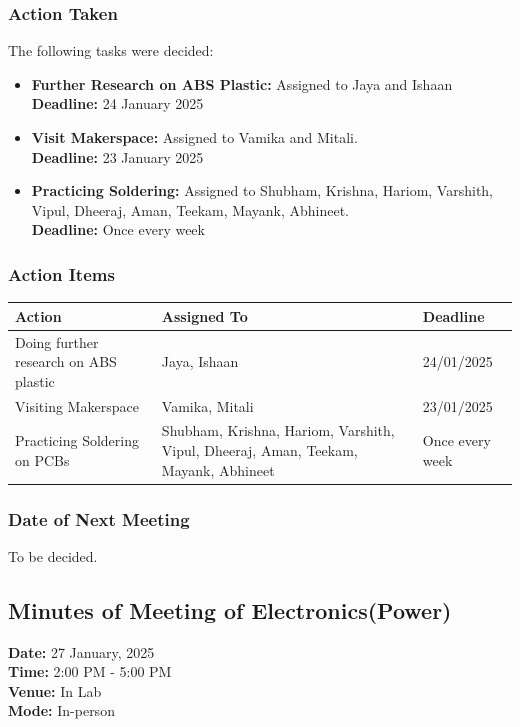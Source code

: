 \documentclass[12pt,a4paper]{article}
\begin{document}
\subsubsection*{Action Taken}
The following tasks were decided:
\begin{itemize}
    \item \textbf{Further Research on ABS Plastic:} Assigned to Jaya and Ishaan \\
    \textbf{Deadline:} 24 January 2025
    \item \textbf{Visit Makerspace:} Assigned to Vamika and Mitali. \\
    \textbf{Deadline:} 23 January 2025
    \item \textbf{Practicing Soldering:} Assigned to Shubham, Krishna, Hariom, Varshith, Vipul, Dheeraj, Aman, Teekam, Mayank, Abhineet. \\
    \textbf{Deadline:} Once every week
\end{itemize}

\subsubsection*{Action Items}
\renewcommand{\arraystretch}{1.5}
\begin{tabular}{|m{6cm}|>{\raggedright\arraybackslash}m{4cm}|m{4cm}|}
    \hline
    \textbf{Action} & \textbf{Assigned To} & \textbf{Deadline} \\
    \hline
    Doing further research on ABS plastic & Jaya, Ishaan & 24/01/2025 \\
    \hline
    Visiting Makerspace & Vamika, Mitali & 23/01/2025 \\
    \hline
    Practicing Soldering on PCBs & Shubham, Krishna, Hariom, Varshith, Vipul, Dheeraj, Aman, Teekam, Mayank, Abhineet & Once every week \\
    \hline
\end{tabular}

\subsubsection*{Date of Next Meeting}
To be decided.

\subsection*{Minutes of Meeting  of Electronics(Power)}

\noindent
\textbf{Date:} 27 January, 2025 \\
\textbf{Time:} 2:00 PM - 5:00 PM \\
\textbf{Venue:} In Lab \\
\textbf{Mode:} In-person \\
\end{document}
